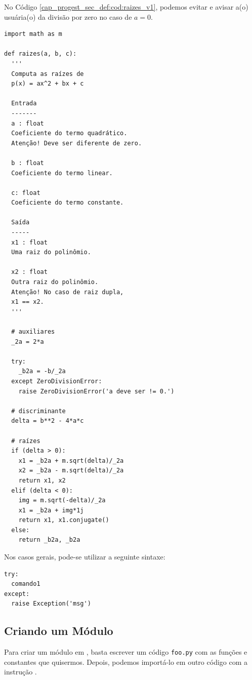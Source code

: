 \begin{ex}
  No Código \ref{cap_progest_sec_def:cod:raizes_v1}, podemos evitar e avisar a(o) usuária(o) da divisão por zero no caso de $a=0$.

\begin{lstlisting}[caption=raizes\_v2.py]
import math as m

def raizes(a, b, c):
  '''
  Computa as raízes de
  p(x) = ax^2 + bx + c

  Entrada
  -------
  a : float
  Coeficiente do termo quadrático.
  Atenção! Deve ser diferente de zero.

  b : float 
  Coeficiente do termo linear.

  c: float
  Coeficiente do termo constante.

  Saída
  -----
  x1 : float
  Uma raiz do polinômio.

  x2 : float
  Outra raiz do polinômio.
  Atenção! No caso de raiz dupla,
  x1 == x2.
  '''

  # auxiliares
  _2a = 2*a

  try:
    _b2a = -b/_2a
  except ZeroDivisionError:
    raise ZeroDivisionError('a deve ser != 0.')

  # discriminante
  delta = b**2 - 4*a*c

  # raízes
  if (delta > 0):
    x1 = _b2a + m.sqrt(delta)/_2a
    x2 = _b2a - m.sqrt(delta)/_2a
    return x1, x2
  elif (delta < 0):
    img = m.sqrt(-delta)/_2a
    x1 = _b2a + img*1j
    return x1, x1.conjugate()
  else:
    return _b2a, _b2a
\end{lstlisting}

\end{ex}

\begin{obs}
  Nos casos gerais, pode-se utilizar a seguinte sintaxe:

\begin{lstlisting}
try:
  comando1
except:
  raise Exception('msg')
\end{lstlisting}

\end{obs}

\subsection{Criando um Módulo}

Para criar um módulo em {\python}, basta escrever um código \lstinline+foo.py+ com as funções e constantes que quisermos. Depois, podemos importá-lo em outro código com a instrução {\PYTHONimport}.


